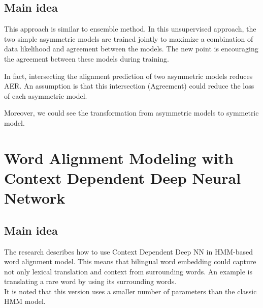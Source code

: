 \documentclass{article}
\begin{document}
\subsection{Main idea}
This approach is similar to ensemble method. In this unsupervised approach, the two simple asymmetric models are trained jointly to maximize a combination of data likelihood and agreement between the models. The new point is encouraging the agreement between these models during training.

In fact, intersecting the alignment prediction of two asymmetric models reduces AER. An assumption is that this intersection (Agreement) could reduce the loss of each asymmetric model.

Moreover, we could see the transformation from asymmetric models to symmetric model.

\subsection{}





\section{Word Alignment Modeling with Context Dependent Deep Neural Network \citep{Yang13word}}

\subsection{Main idea}
The research describes how to use Context Dependent Deep NN in HMM-based word alignment model. This means that bilingual word embedding could capture not only lexical translation and context from surrounding words.
An example is translating a rare word by using its surrounding words.\\
It is noted that this version uses a smaller number of parameters than the classic HMM model.
\end{document}
